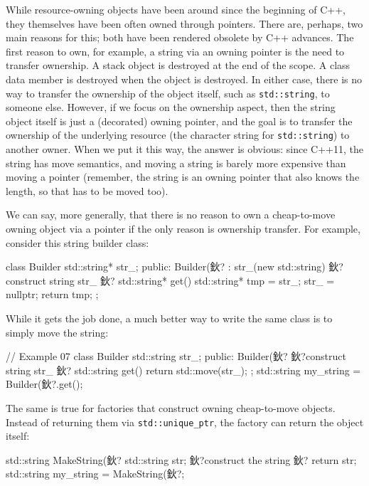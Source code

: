 While resource-owning objects have been around since the beginning of C++, they themselves have been often owned through pointers. There are, perhaps, two main reasons for this; both have been rendered obsolete by C++ advances. The first reason to own, for example, a string via an owning pointer is the need to transfer ownership. A stack object is destroyed at the end of the scope. A class data member is destroyed when the object is destroyed. In either case, there is no way to transfer the ownership of the object itself, such as \texttt{std::string}, to someone else. However, if we focus on the ownership aspect, then the string object itself is just a (decorated) owning pointer, and the goal is to transfer the ownership of the underlying resource (the character string for \texttt{std::string}) to another owner. When we put it this way, the answer is obvious: since C++11, the string has move semantics, and moving a string is barely more expensive than moving a pointer (remember, the string is an owning pointer that also knows the length, so that has to be moved too).

We can say, more generally, that there is no reason to own a cheap-to-move owning object via a pointer if the only reason is ownership transfer. For example, consider this string builder class:

\begin{code}
class Builder {
  std::string* str_;
  public:
  Builder(鈥? : str_(new std::string){
    鈥?construct string str_ 鈥?
  }
  std::string* get(){
    std::string* tmp = str_;
    str_ = nullptr;
    return tmp;
  }
};
\end{code}

While it gets the job done, a much better way to write the same class is to simply move the string:

\begin{code}
// Example 07
class Builder {
  std::string str_;
  public:
  Builder(鈥?{ 鈥?construct string str_ 鈥?}
  std::string get(){ return std::move(str_); }
};
std::string my_string = Builder(鈥?.get();
\end{code}

The same is true for factories that construct owning cheap-to-move objects. Instead of returning them via \texttt{std::unique\_ptr}, the factory can return the object itself:

\begin{code}
std::string MakeString(鈥? {
  std::string str;
  鈥?construct the string 鈥?
  return str;
}
std::string my_string = MakeString(鈥?;
\end{code}

